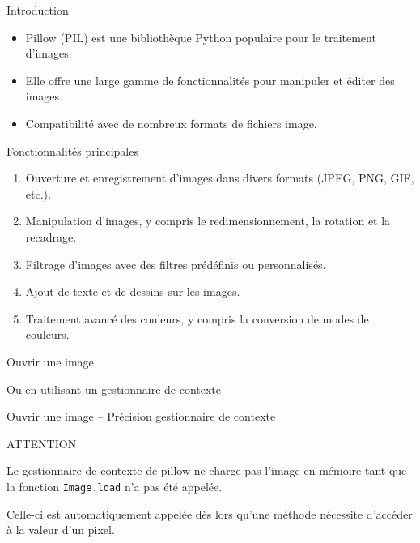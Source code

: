 \begin{frame}{Introduction}
    \begin{itemize}
        \item \alert{Pillow} (PIL) est une bibliothèque Python populaire pour le traitement d'images.
        \item Elle offre une large gamme de fonctionnalités pour manipuler et éditer des
              images.
        \item Compatibilité avec de nombreux formats de fichiers image.
    \end{itemize}
\end{frame}

\begin{frame}{Fonctionnalités principales}
    \begin{enumerate}
        \item Ouverture et enregistrement d'images dans divers formats (JPEG, PNG, GIF,
              etc.).
        \item Manipulation d'images, y compris le redimensionnement, la rotation et la
              recadrage.
        \item Filtrage d'images avec des filtres prédéfinis ou personnalisés.
        \item Ajout de texte et de dessins sur les images.
        \item Traitement avancé des couleurs, y compris la conversion de modes de couleurs.
    \end{enumerate}
\end{frame}

\begin{frame}{Ouvrir une image}


    Ou en utilisant un gestionnaire de contexte

    
\end{frame}

\begin{frame}{Ouvrir une image -- Précision gestionnaire de contexte}
    \begin{center}
        \alert{ATTENTION}
    \end{center}
    
    Le gestionnaire de contexte de pillow ne charge pas l'image en mémoire tant que la fonction \texttt{Image.load} n'a pas été appelée. 
    
    Celle-ci est automatiquement appelée dès lors qu'une méthode nécessite d'accéder à la valeur d'un pixel.
    
\end{frame}

